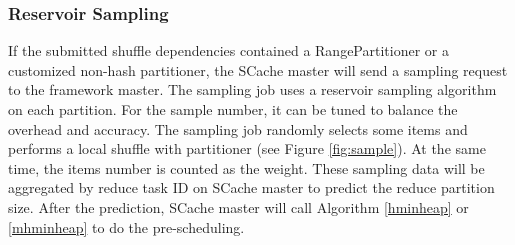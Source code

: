\subsubsection{Reservoir Sampling}\label{sampling}
If the submitted shuffle dependencies contained a RangePartitioner or a customized non-hash partitioner, {\color{blue}the SCache master will send a sampling request to the framework master}. 
The sampling job uses a reservoir sampling algorithm \cite{reservoir} on each partition. 
For the sample number, it can be tuned to balance the overhead and accuracy. 
The sampling job randomly selects some items and performs a local shuffle with partitioner (see Figure \ref{fig:sample}). 
At the same time, the items number is counted as the weight. 
These sampling data will be aggregated by reduce task ID on SCache master to predict the reduce partition size. 
After the prediction, SCache master will call Algorithm \ref{hminheap} or \ref{mhminheap} to do the pre-scheduling.


